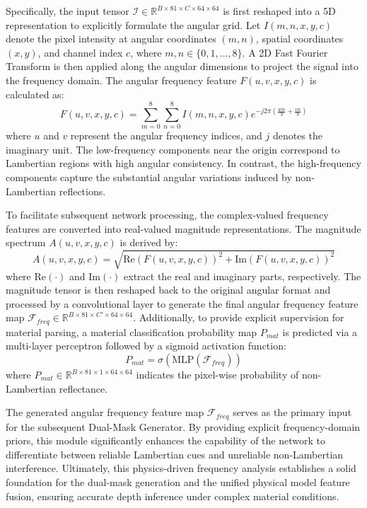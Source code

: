 Specifically, the input tensor $\mathcal{I} \in \mathbb{R}^{B \times 81 \times C \times 64 \times 64}$ is first reshaped into a 5D representation to explicitly formulate the angular grid. Let $I(m,n,x,y,c)$ denote the pixel intensity at angular coordinates $(m,n)$, spatial coordinates $(x,y)$, and channel index $c$, where $m,n \in \{0, 1, \dots, 8\}$. A 2D Fast Fourier Transform is then applied along the angular dimensions to project the signal into the frequency domain. The angular frequency feature $F(u,v,x,y,c)$ is calculated as:
\begin{equation}
\label{eq:eq20}
F(u,v,x,y,c) = \sum_{m=0}^{8}\sum_{n=0}^{8} I(m,n,x,y,c) e^{-j 2\pi \left(\frac{um}{9} + \frac{vn}{9}\right)}
\end{equation}
where $u$ and $v$ represent the angular frequency indices, and $j$ denotes the imaginary unit. The low-frequency components near the origin correspond to Lambertian regions with high angular consistency. In contrast, the high-frequency components capture the substantial angular variations induced by non-Lambertian reflections. 

To facilitate subsequent network processing, the complex-valued frequency features are converted into real-valued magnitude representations. The magnitude spectrum $A(u,v,x,y,c)$ is derived by:
\begin{equation}
\label{eq:eq21}
A(u,v,x,y,c) = \sqrt{\text{Re}(F(u,v,x,y,c))^2 + \text{Im}(F(u,v,x,y,c))^2}
\end{equation}
where $\text{Re}(\cdot)$ and $\text{Im}(\cdot)$ extract the real and imaginary parts, respectively. The magnitude tensor is then reshaped back to the original angular format and processed by a convolutional layer to generate the final angular frequency feature map $\mathcal{F}_{freq} \in \mathbb{R}^{B \times 81 \times C' \times 64 \times 64}$. Additionally, to provide explicit supervision for material parsing, a material classification probability map $P_{mat}$ is predicted via a multi-layer perceptron followed by a sigmoid activation function:
\begin{equation}
\label{eq:eq22}
P_{mat} = \sigma(\text{MLP}(\mathcal{F}_{freq}))
\end{equation}
where $P_{mat} \in \mathbb{R}^{B \times 81 \times 1 \times 64 \times 64}$ indicates the pixel-wise probability of non-Lambertian reflectance.

The generated angular frequency feature map $\mathcal{F}_{freq}$ serves as the primary input for the subsequent Dual-Mask Generator. By providing explicit frequency-domain priors, this module significantly enhances the capability of the network to differentiate between reliable Lambertian cues and unreliable non-Lambertian interference. Ultimately, this physics-driven frequency analysis establishes a solid foundation for the dual-mask generation and the unified physical model feature fusion, ensuring accurate depth inference under complex material conditions.

